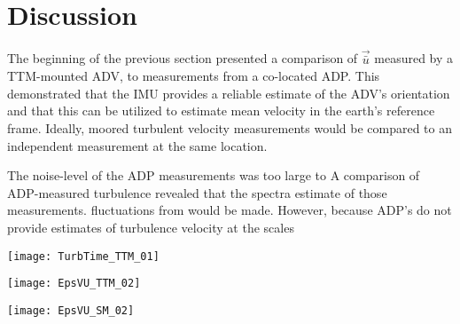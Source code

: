 
\section{Discussion}

The beginning of the previous section presented a comparison of $\vec{\bar{u}}$ measured by a TTM-mounted ADV, to measurements from a co-located ADP. This demonstrated that the IMU provides a reliable estimate of the ADV's orientation and that this can be utilized to estimate mean velocity in the earth's reference frame. Ideally, moored turbulent velocity measurements would be compared to an independent measurement at the same location.


The noise-level of the ADP measurements was too large to 
A comparison of ADP-measured turbulence revealed that the spectra estimate of those measurements.   fluctuations from would be made. However, because ADP's do not provide estimates of turbulence velocity at the scales 

\begin{figure*}[t]
  \centering
  \texttt{[image: TurbTime\_TTM\_01]}
  \caption{Time-series of mean velocities (A), turbulence energy and its components (B), Reynold's stresses (C), and turbulence dissipation rate (D) measured by the TTM during the June, 2014 deployment. Shading indicates periods of ebb ($\bar{u}>1.0$, grey), and flood ($\bar{u}<-1.0$, lighter grey).}
  \label{fig:turbtime:ttm}
\end{figure*}

\begin{figure*}[t]
  \centering
  \texttt{[image: EpsVU\_TTM\_02]}
  \caption{$\epsilon$ versus $\bar{U}$ for the June 2014 TTM deployment during ebb (left), and flood (right). Small points are 5 minute averages, and their color indicates the angle of the mean horizontal velocity relative to the principal ebb or flood direction ($\Delta\theta=\theta-\theta_\circ$, where $\theta$ is the horizontal velocity direction, and $\theta_\circ$ is 310$^\circ$ and 130$^\circ$ true for ebb and flood, respectively).  Green dots are mean values within speed bins of 0.2 m s$^{-1}$ width that have at least 6 points (30 minutes of data); their vertical bars are 95\% bootstrap confidence intervals. The black line shows a $U^3$ slope, where the proportionality constant (grey box) is calculated by taking the log-space mean of $\epsilon/U^3$. }
  \label{fig:epsVu:ttm}
\end{figure*}

\begin{figure*}[t]
  \centering
  \texttt{[image: EpsVU\_SM\_02]}
  \caption{$\epsilon$ versus $\bar{U}$ for the May 2015 StableMoor deployment during ebb (left), and flood (right). The markers and annotations are identical to figure \ref{fig:epsVu:ttm}. }
  \label{fig:epsVu:sm}
\end{figure*}

